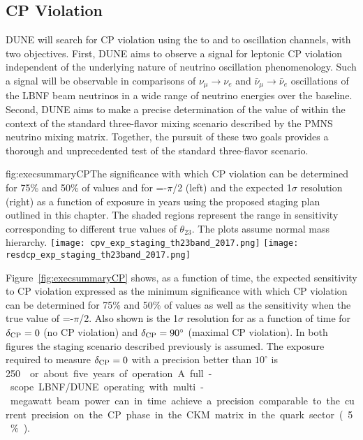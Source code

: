 \subsection{CP Violation}

DUNE will search for CP violation using the \numu to \nue and \anumu
to \anue oscillation channels, with two objectives.  First, DUNE aims
to observe a signal for leptonic CP violation independent of the
underlying nature of neutrino oscillation phenomenology. Such a signal
will be observable in comparisons of $\nu_\mu \rightarrow \nu_e$ and
$\bar{\nu}_{\mu} \rightarrow \bar{\nu}_e$ oscillations of the LBNF
beam neutrinos in a wide range of neutrino energies over the
 baseline.
Second,
DUNE aims to make a precise determination of the value of \deltacp
within the context of the standard three-flavor mixing scenario
described by the PMNS neutrino mixing matrix. Together, the pursuit of
these two goals provides a thorough and unprecedented test of the standard three-flavor
scenario.

\begin{dunefigure}{fig:execsummaryCP}{The
    significance with which CP violation can be determined for 75\% and 50\% of
    \deltacp values and for \deltacp=-$\pi$/2 (left) and the expected 1$\sigma$ resolution
    (right) as a function of exposure in years using the proposed
    staging plan outlined in this chapter. The shaded regions
    represent the range in sensitivity corresponding to
    different true values of $\theta_{23}$. The plots assume normal mass hierarchy.}
\texttt{[image: cpv\_exp\_staging\_th23band\_2017.png]}
 \texttt{[image: resdcp\_exp\_staging\_th23band\_2017.png]}
\end{dunefigure}
%
Figure~\ref{fig:execsummaryCP} shows, as a function of time, the
expected sensitivity to CP violation expressed as the minimum significance
with which CP violation can be determined for 75\% and 50\% of
\deltacp values as well as the sensitivity when the true value of \deltacp=-$\pi$/2.
Also shown is the 1$\sigma$ resolution for \deltacp as a
function of time for $\delta_{\rm CP}=0$ (no CP violation) and
$\delta_{\rm CP}=90^\circ$ (maximal CP violation). In both figures the staging scenario
described previously is assumed.  The exposure required to measure
$\delta_{\rm CP} = 0 $ with a precision better than $10^\circ$ is \SI{250}~\ktMWyr{} or about five years of operation. A full-scope LBNF/DUNE operating with 
multi-megawatt 
beam power can in time achieve a precision 
comparable to the current precision on the CP phase in the
CKM matrix in the quark sector (5\%).

